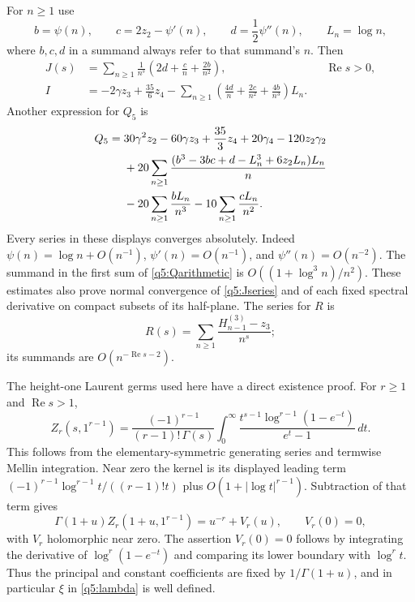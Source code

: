 For $n\geq1$ use
\begin{equation}\label{q5:integer-bcd}
 b=\psi(n),\qquad c=2z_2-\psi'(n),\qquad
 d=\frac12\psi''(n),\qquad L_n=\log n,
\end{equation}
where $b,c,d$ in a summand always refer to that summand's $n$.
Then
\begin{align}
 J(s)&=\sum_{n\geq1}\frac1{n^s}
      \left(2d+\frac{c}{n}+\frac{2b}{n^2}\right),
      &&\operatorname{Re}s>0,\label{q5:Jseries}\\
 I&=-2\gamma z_3+\frac{35}{6}z_4
       -\sum_{n\geq1}
        \left(\frac{4d}{n}+\frac{2c}{n^2}
                         +\frac{4b}{n^3}\right)L_n.
 \label{q5:Iarithmetic}
\end{align}
Another expression for $Q_5$ is
\begin{align}\label{q5:Qarithmetic}
 Q_5={}&30\gamma^2z_2-60\gamma z_3+\frac{35}{3}z_4
           +20\gamma_4-120z_2\gamma_2\notag\\
 &+20\sum_{n\geq1}
     \frac{(b^3-3bc+d-L_n^3+6z_2L_n)L_n}{n}\notag\\
 &-20\sum_{n\geq1}\frac{bL_n}{n^3}
       -10\sum_{n\geq1}\frac{cL_n}{n^2}.
\end{align}
Every series in these displays converges absolutely.  Indeed
$\psi(n)=\log n+O(n^{-1})$,
$\psi'(n)=O(n^{-1})$, and $\psi''(n)=O(n^{-2})$.
The summand in the first sum of \eqref{q5:Qarithmetic} is
$O((1+\log^3n)/n^2)$.  These estimates also prove normal convergence
of \eqref{q5:Jseries} and of each fixed spectral derivative on compact
subsets of its half-plane.  The series for $R$ is
\[
 R(s)=\sum_{n\geq1}
       \frac{H_{n-1}^{(3)}-z_3}{n^s};
\]
its summands are $O(n^{-\operatorname{Re}s-2})$.

The height-one Laurent germs used here have a direct existence proof.
For $r\geq1$ and $\operatorname{Re}s>1$,
\begin{equation}\label{q5:mellin}
 Z_r(s,1^{r-1})=
 \frac{(-1)^{r-1}}{(r-1)!\,\Gamma(s)}
 \int_0^\infty
    \frac{t^{s-1}\log^{r-1}(1-e^{-t})}{e^t-1}\,dt.
\end{equation}
This follows from the elementary-symmetric generating series and
termwise Mellin integration.  Near zero the kernel is its displayed
leading term
$(-1)^{r-1}\log^{r-1}t/((r-1)!t)$ plus
$O(1+|\log t|^{r-1})$.  Subtraction of that term gives
\[
 \Gamma(1+u)Z_r(1+u,1^{r-1})=u^{-r}+V_r(u),
 \qquad V_r(0)=0,
\]
with $V_r$ holomorphic near zero.  The assertion $V_r(0)=0$ follows
by integrating the derivative of $\log^r(1-e^{-t})$ and comparing its
lower boundary with $\log^r t$.  Thus the principal and constant
coefficients are fixed by $1/\Gamma(1+u)$, and in particular $\xi$
in \eqref{q5:lambda} is well defined.

